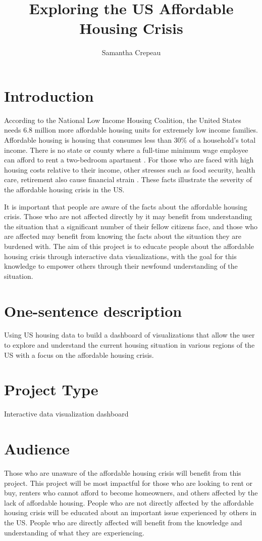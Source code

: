 \documentclass{proc}
\begin{document}
\title{Exploring the US Affordable Housing Crisis}

\author{Samantha Crepeau}

\maketitle

\section{Introduction}
According to the National Low Income Housing Coalition, the United States needs 6.8 million more affordable housing units for extremely low income families. Affordable housing is housing that consumes less than 30\% of a household’s total income. There is no state or county where a full-time minimum wage employee can afford to rent a two-bedroom apartment \cite{NLIHCprob}. For those who are faced with high housing costs relative to their income, other stresses such as food security, health care, retirement also cause financial strain \cite{corradino}. These facts illustrate the severity of the affordable housing crisis in the US. 

It is important that people are aware of the facts about the affordable housing crisis. Those who are not affected directly by it may benefit from understanding the situation that a significant number of their fellow citizens face, and those who are affected may benefit from knowing the facts about the situation they are burdened with. The aim of this project is to educate people about the affordable housing crisis through interactive data visualizations, with the goal for this knowledge to empower others through their newfound understanding of the situation. 

\section{One-sentence description}
Using US housing data to build a dashboard of visualizations that allow the user to explore and understand the current housing situation in various regions of the US with a focus on the affordable housing crisis.

\section{Project Type}
Interactive data visualization dashboard

\section{Audience} 
Those who are unaware of the affordable housing crisis will benefit from this project. This project will be most impactful for those who are looking to rent or buy, renters who cannot afford to become homeowners, and others affected by the lack of affordable housing. People who are not directly affected by the affordable housing crisis will be educated about an important issue experienced by others in the US. People who are directly affected will benefit from the knowledge and understanding of what they are experiencing. 
\end{document}
